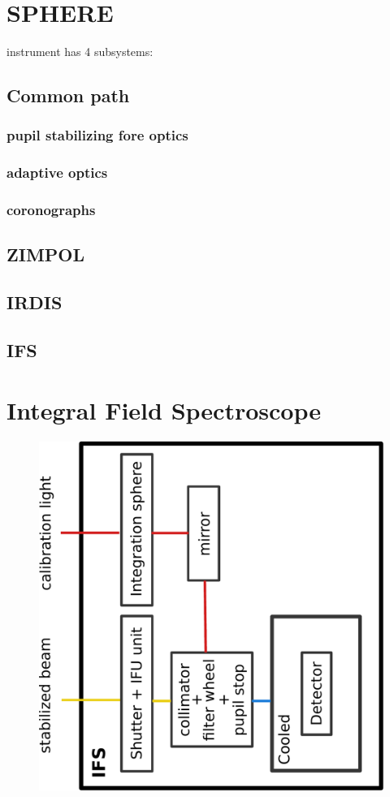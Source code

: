 \documentclass[twoside,single]{lion-msc}
\begin{document}
\section{SPHERE}
instrument has 4 subsystems:\\
\subsection{Common path}
\subsubsection{pupil stabilizing fore optics}
\subsubsection{adaptive optics}
\subsubsection{coronographs}

\subsection{ZIMPOL}
\subsection{IRDIS}
\subsection{IFS}

\section{Integral Field Spectroscope}

\begin{figure}[htbp]
\centering 
\includegraphics[trim={13cm 5cm 10cm 7cm},clip,scale = 0.47]{overviewIFS}
\caption{} 
\label{}
\end{figure}
\end{document}
